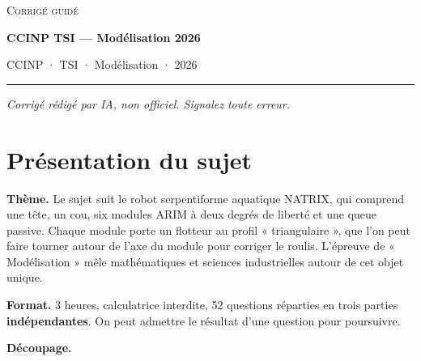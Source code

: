 \documentclass[11pt,a4paper]{article}
\begin{document}
\thispagestyle{plain}
\begin{center}
  {\small\scshape Corrigé guidé}\par\smallskip
  {\LARGE\bfseries CCINP TSI — Modélisation 2026\par}\medskip
  {\large CCINP · TSI · Modélisation · 2026\par}
\end{center}
\vspace{2pt}\hrule\vspace{8pt}

\emph{Corrigé rédigé par IA, non officiel. Signalez toute erreur.}

\hypertarget{pruxe9sentation-du-sujet}{%
\section{Présentation du sujet}\label{pruxe9sentation-du-sujet}}

\textbf{Thème.} Le sujet suit le robot serpentiforme aquatique NATRIX, qui comprend une tête, un cou, six modules ARIM à deux degrés de liberté et une queue passive. Chaque module porte un flotteur au profil « triangulaire », que l'on peut faire tourner autour de l'axe du module pour corriger le roulis. L'épreuve de « Modélisation » mêle mathématiques et sciences industrielles autour de cet objet unique.

\textbf{Format.} 3 heures, calculatrice interdite, 52 questions réparties en trois parties \textbf{indépendantes}. On peut admettre le résultat d'une question pour poursuivre.

\textbf{Découpage.}
\end{document}
